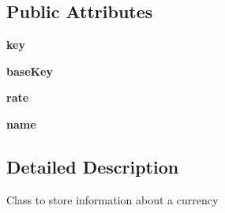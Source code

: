 \subsection*{Public Attributes}
\begin{DoxyCompactItemize}
\item 
\hypertarget{class_solar_calculator_1_1_utils_1_1_py_exchange_rates_1_1_currency_ab3c46c9b3660b594ae4b7fa3243ebef5}{{\bfseries key}}\label{class_solar_calculator_1_1_utils_1_1_py_exchange_rates_1_1_currency_ab3c46c9b3660b594ae4b7fa3243ebef5}

\item 
\hypertarget{class_solar_calculator_1_1_utils_1_1_py_exchange_rates_1_1_currency_aa449bd869f83a1a258a53cfd0df056da}{{\bfseries base\-Key}}\label{class_solar_calculator_1_1_utils_1_1_py_exchange_rates_1_1_currency_aa449bd869f83a1a258a53cfd0df056da}

\item 
\hypertarget{class_solar_calculator_1_1_utils_1_1_py_exchange_rates_1_1_currency_a35abfa4f61e0026ae066c730f3a6b2f2}{{\bfseries rate}}\label{class_solar_calculator_1_1_utils_1_1_py_exchange_rates_1_1_currency_a35abfa4f61e0026ae066c730f3a6b2f2}

\item 
\hypertarget{class_solar_calculator_1_1_utils_1_1_py_exchange_rates_1_1_currency_afd3fefbee01426cfe6b82f5dd63e1265}{{\bfseries name}}\label{class_solar_calculator_1_1_utils_1_1_py_exchange_rates_1_1_currency_afd3fefbee01426cfe6b82f5dd63e1265}

\end{DoxyCompactItemize}


\subsection{Detailed Description}
\begin{DoxyVerb}Class to store information about a currency \end{DoxyVerb}
 

